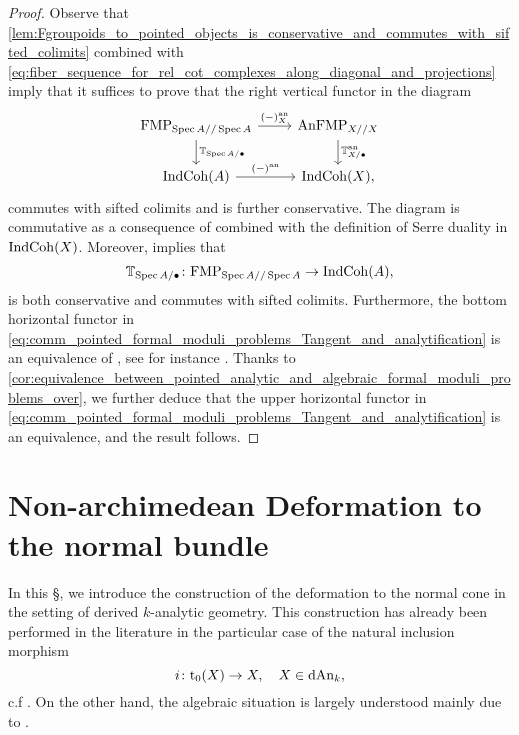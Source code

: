 \documentclass[10pt,a4paper,reqno]{amsart} %
\theoremstyle{plain}
\theoremstyle{definition}
\theoremstyle{remark}
\numberwithin{equation}{section}
\begin{document}
\begin{proof}
    Observe that
    \cref{lem:Fgroupoids_to_pointed_objects_is_conservative_and_commutes_with_sifted_colimits} combined with
    \eqref{eq:fiber_sequence_for_rel_cot_complexes_along_diagonal_and_projections} imply that it suffices to prove that
    the right vertical functor in the diagram
        \begin{equation} \label{eq:comm_pointed_formal_moduli_problems_Tangent_and_analytification}
        \begin{tikzcd}
            \mathrm{FMP}_{\Spec A/ / \Spec A} \ar{r}{(-)\an_X}\ar{d}{\bbT_{\Spec A/ \bullet}} & \anFMP_{X/ / X} \ar{d}{\bbT\an_{X/ \bullet}} \\
            \Ind\Coh(A) \ar{r}{(-)\an} & \Ind\Coh(X),
        \end{tikzcd}
        \end{equation}
    commutes with sifted colimits and is further conservative. The diagram is commutative as a consequence of \cite[Lemma 6.9 (2)]{Porta_Yu_NQK}
    combined with the definition of Serre duality in $\mathrm{Ind}\mathrm{Coh}(X)$. Moreover, \cite[Corollary 4.31]{Antonio_Koszul} implies that
        \[
            \mathbb T_{\operatorname{Spec} A/ \bullet} \colon     \mathrm{FMP}_{\operatorname{Spec} A/ / \operatorname{Spec} A} \to \mathrm{Ind}\mathrm{Coh}(A),
        \]
    is both conservative and commutes with sifted colimits. Furthermore, the bottom horizontal functor in \eqref{eq:comm_pointed_formal_moduli_problems_Tangent_and_analytification}
    is an equivalence of \infcats, see for instance \cite[Theorem 4.5]{Porta_Yu_NQK}. Thanks to \cref{cor:equivalence_between_pointed_analytic_and_algebraic_formal_moduli_problems_over}, we further deduce
    that the upper horizontal functor in \eqref{eq:comm_pointed_formal_moduli_problems_Tangent_and_analytification} is an equivalence, and the result follows.
\end{proof}




\section{Non-archimedean Deformation to the normal bundle}

In this \S, we introduce the construction of the deformation to the normal cone in the setting of derived $k$-analytic geometry. This construction has
already been performed in the literature in the particular case of the natural inclusion morphism
    \[
        i \colon \mathrm{t}_0(X) \to X,  \quad X \in \mathrm{dAn}_k,
    \]
c.f \cite{Porta_Yu_NQK}.
On the other hand, the algebraic situation is largely understood mainly due to \cite{Gaitsgory_Study_II}.
\end{document}
